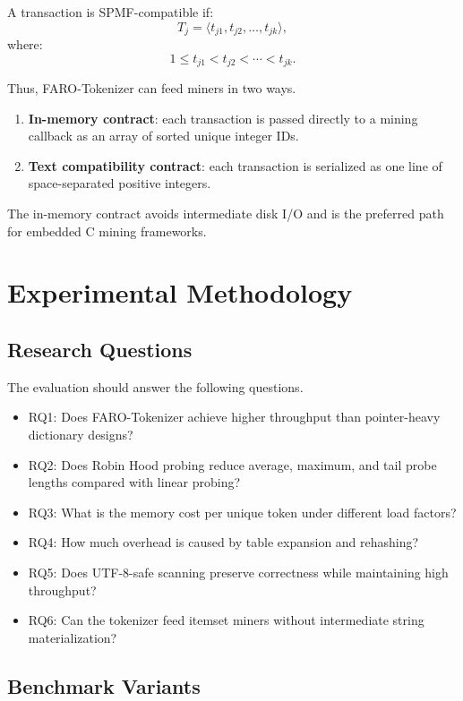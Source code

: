 \documentclass[11pt,a4paper]{article}
\begin{document}
A transaction is SPMF-compatible if:
\[
T_j=\langle t_{j1},t_{j2},\dots,t_{jk}\rangle,
\]
where:
\[
1\le t_{j1}<t_{j2}<\cdots<t_{jk}.
\]

Thus, FARO-Tokenizer can feed miners in two ways.

\begin{enumerate}[label=(\arabic*)]
\item \textbf{In-memory contract}: each transaction is passed directly to a mining callback as an array of sorted unique integer IDs.
\item \textbf{Text compatibility contract}: each transaction is serialized as one line of space-separated positive integers.
\end{enumerate}

The in-memory contract avoids intermediate disk I/O and is the preferred path for embedded C mining frameworks.

\section{Experimental Methodology}

\subsection{Research Questions}

The evaluation should answer the following questions.

\begin{itemize}
\item RQ1: Does FARO-Tokenizer achieve higher throughput than pointer-heavy dictionary designs?
\item RQ2: Does Robin Hood probing reduce average, maximum, and tail probe lengths compared with linear probing?
\item RQ3: What is the memory cost per unique token under different load factors?
\item RQ4: How much overhead is caused by table expansion and rehashing?
\item RQ5: Does UTF-8-safe scanning preserve correctness while maintaining high throughput?
\item RQ6: Can the tokenizer feed itemset miners without intermediate string materialization?
\end{itemize}

\subsection{Benchmark Variants}
\end{document}
